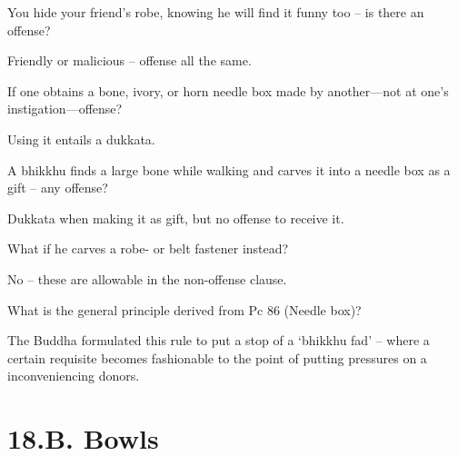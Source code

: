 \bigskip

You hide your friend's robe, knowing he will find it funny too – is there an offense?

\bigskip

\begin{solution}
  Friendly or malicious – offense all the same.
\end{solution}


If one obtains a bone, ivory, or horn needle box made by another—not at one’s instigation—offense?

\begin{solution}
  Using it entails a dukkata. 
\end{solution}

\bigskip

A bhikkhu finds a large bone while walking and carves it into a needle box as a gift – any offense?

\begin{solution}
  Dukkata when making it as gift, but no offense to receive it.
\end{solution}

\bigskip

What if he carves a robe- or belt fastener instead?

\begin{solution}
  No – these are allowable in the non-offense clause. 
\end{solution}

\bigskip

What is the general principle derived from Pc 86 (Needle box)?

\begin{solution}
  The Buddha formulated this rule to put a stop of a ‘bhikkhu fad’ – where a
  certain requisite becomes fashionable to the point of putting pressures on a
  inconveniencing donors.
\end{solution}

\chapter{18.B. Bowls}
\renewcommand*{\theChapterTitle}{18.B. Bowls}
